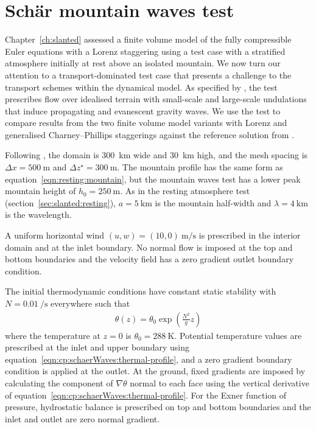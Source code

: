 \section{Sch\"{a}r mountain waves test}
\label{sec:cp:schaerWaves}

Chapter~\ref{ch:slanted} assessed a finite volume model of the fully compressible Euler equations with a Lorenz staggering using a test case with a stratified atmosphere initially at rest above an isolated mountain.
We now turn our attention to a transport-dominated test case that presents a challenge to the transport schemes within the dynamical model.
As specified by \citet{schaer2002}, the test prescribes flow over idealised terrain with small-scale and large-scale undulations that induce propagating and evanescent gravity waves.
We use the test to compare results from the two finite volume model variants with Lorenz and generalised Charney--Phillips staggerings against the reference solution from \citet{melvin2010}.

Following \citet{melvin2010}, the domain is \SI{300}{\kilo\meter} wide and \SI{30}{\kilo\meter} high, and the mesh spacing is $\Delta x = \SI{500}{\meter}$ and $\Delta z^\star = \SI{300}{\meter}$.
The mountain profile has the same form as equation~\eqref{eqn:resting:mountain}, but the mountain waves test has a lower peak mountain height of $h_0 = \SI{250}{\meter}$.  As in the resting atmosphere test (section~\ref{sec:slanted:resting}), $a = \SI{5}{\kilo\meter}$ is the mountain half-width and $\lambda = \SI{4}{\kilo\meter}$ is the wavelength.

A uniform horizontal wind $(u, w) = (10, 0)\:\si{\meter\per\second}$ is prescribed in the interior domain and at the inlet boundary.  No normal flow is imposed at the top and bottom boundaries and the velocity field has a zero gradient outlet boundary condition.

The initial thermodynamic conditions have constant static stability with $N = \SI{0.01}{\per\second}$ everywhere such that
\begin{align}
	\theta(z) = \theta_0 \exp \left( \frac{N^2}{g} z \right) \label{eqn:cp:schaerWaves:thermal-profile}
\end{align}
where the temperature at $z=0$ is $\theta_0 = \SI{288}{\kelvin}$.
Potential temperature values are prescribed at the inlet and upper boundary using equation~\eqref{eqn:cp:schaerWaves:thermal-profile}, and a zero gradient boundary condition is applied at the outlet.
At the ground, fixed gradients are imposed by calculating the component of $\nabla \theta$ normal to each face using the vertical derivative of equation~\eqref{eqn:cp:schaerWaves:thermal-profile}.
For the Exner function of pressure, hydrostatic balance is prescribed on top and bottom boundaries and the inlet and outlet are zero normal gradient.

